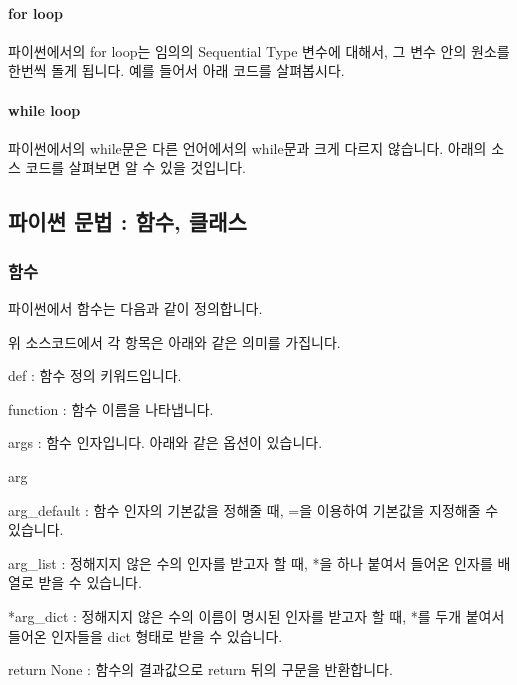 \documentclass[titlepage]{report}
\begin{document}
\paragraph{for loop} 파이썬에서의 for loop는 임의의 Sequential Type 변수에 대해서, 그 변수 안의 원소를 한번씩 돌게 됩니다. 예를 들어서 아래 코드를 살펴봅시다. 




\paragraph{while loop} 파이썬에서의 while문은 다른 언어에서의 while문과 크게 다르지 않습니다. 아래의 소스 코드를 살펴보면 알 수 있을 것입니다. 



                
                
\subsection{파이썬 문법 : 함수, 클래스}

\subsubsection{함수}

파이썬에서 함수는 다음과 같이 정의합니다. 



                
위 소스코드에서 각 항목은 아래와 같은 의미를 가집니다. 

\begin{compactitem} 
\item def : 함수 정의 키워드입니다. 
\item function : 함수 이름을 나타냅니다. 
\item args : 함수 인자입니다. 아래와 같은 옵션이 있습니다. 
\begin{compactitem} 
\item arg 
\item arg\_default : 함수 인자의 기본값을 정해줄 때, =을 이용하여 기본값을 지정해줄 수 있습니다. 
\item *arg\_list : 정해지지 않은 수의 인자를 받고자 할 때, *을 하나 붙여서 들어온 인자를 배열로 받을 수 있습니다. 
\item **arg\_dict : 정해지지 않은 수의 이름이 명시된 인자를 받고자 할 때, *를 두개 붙여서 들어온 인자들을 dict 형태로 받을 수 있습니다. 
\end{compactitem} 
\item return None : 함수의 결과값으로 return 뒤의 구문을 반환합니다. 
\end{compactitem}
\end{document}
